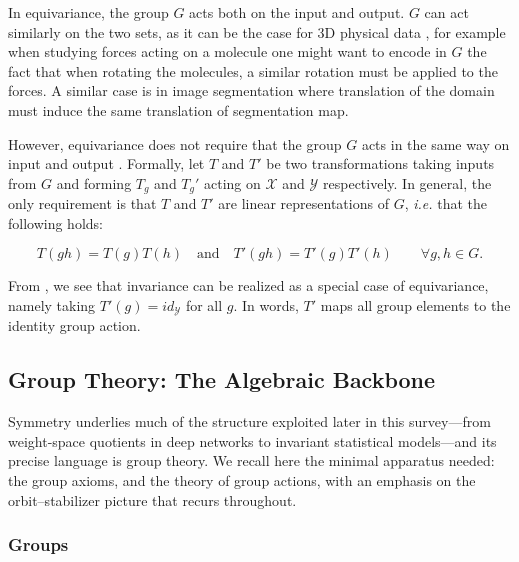 \documentclass[mathematics,review,submit,moreauthors]{Definitions/mdpi}
\begin{document}
In equivariance, the group $G$ acts both on the input and output.
$G$ can act similarly on the two sets, as it can be the case for 3D physical data \cite{geiger2022,bogatskiy2020p3icml}, for example when studying forces acting on a molecule one might want to encode in $G$ the fact that when rotating the molecules, a similar rotation must be applied to the forces.
A similar case is in image segmentation where translation of the domain must induce the same translation of segmentation map.

However, equivariance does not require that the group $G$ acts in the same way on input and output \cite{cohen2016a,bogatskiy2020p3icml}.
Formally, let $T$ and $T'$ be two transformations taking inputs from $G$ and forming $T_g$ and $T_g'$ acting on $\mathcal{X}$ and $\mathcal{Y}$ respectively.
In general, the only requirement is that $T$ and $T'$ are linear representations of $G$, \textit{i.e.} that the following holds: 

\begin{equation}\label{eq:general-equivariance}
    T(gh)=T(g)T(h) \quad \textrm{and} \quad T'(gh)=T'(g)T'(h) \qquad \forall g, h \in G.
\end{equation}

From , we see that invariance can be realized as a special case of equivariance, namely taking $T'(g)=id_{\mathcal Y}$ for all $g$.
In words, $T'$ maps all group elements to the identity group action.

\subsection{Group Theory: The Algebraic Backbone}
\label{sec:group-theory-backbone}

Symmetry underlies much of the structure exploited later in this survey---from
weight-space quotients in deep networks to invariant statistical models---and
its precise language is group theory. We recall here the minimal apparatus
needed: the group axioms, and the theory of group actions, with an emphasis
on the orbit--stabilizer picture that recurs throughout.

\subsubsection{Groups}\label{subsec:groups}
\end{document}
